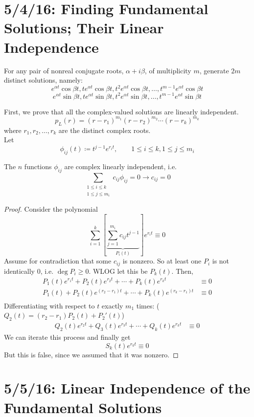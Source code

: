 \documentclass[12pt]{article}
\begin{document}
\section{5/4/16: Finding Fundamental Solutions; Their Linear Independence}
For any pair of nonreal conjugate roots, $\alpha + i\beta$, of multiplicity $m$, generate $2m$ distinct solutions, namely:
\[ e^{\alpha t}\cos{\beta t}, te^{\alpha t}\cos{\beta t}, t^2e^{\alpha t}\cos{\beta t}, \dots, t^{m-1}e^{\alpha t}\cos{\beta t} \]
\[ e^{\alpha t}\sin{\beta t}, te^{\alpha t}\sin{\beta t}, t^2e^{\alpha t}\sin{\beta t}, \dots, t^{m-1}e^{\alpha t}\sin{\beta t} \]

First, we prove that all the complex-valued solutions are linearly independent.
\[ p_L(r) = (r-r_1)^{m_1}(r-r_2)^{m_2}\cdots(r-r_k)^{m_k} \] where $r_1,r_2,\dots,r_k$ are the distinct complex roots. \\
Let \[ \phi_{ij}(t) \coloneqq t^{j-1}e^{r_it}, \qquad 1\le i \le k, 1 \le j \le m_i \]

\begin{theorem}
The $n$ functions $\phi_{ij}$ are complex linearly independent, i.e. \[ \sum_{\substack{1 \le i \le k \\ 1 \le j \le m_i}}c_{ij}\phi_{ij} = 0 \to c_{ij} = 0 \]
\end{theorem}

\begin{proof}
Consider the polynomial \[ \sum_{i=1}^k \left[\underbrace{\sum_{j=1}^{m_i}c_{ij}t^{j-1}}_{P_i(t)}\right]e^{r_it} \equiv 0 \]
Assume for contradiction that some $c_{ij}$ is nonzero. So at least one $P_i$ is not identically 0, i.e. $\deg{P_i} \ge 0$. WLOG let this be $P_k(t)$. Then,
\[
\begin{aligned}
  P_1(t)e^{r_1t} + P_2(t)e^{r_2t} + \cdots + P_k(t)e^{r_kt} &\equiv 0 \\
  P_1(t) + P_2(t)e^{(r_2 - r_1)t} + \cdots + P_k(t)e^{(r_k-r_1)t} &\equiv 0 \\
\end{aligned}
\]
Differentiating with respect to $t$ exactly $m_1$ times: ($Q_2(t) = (r_2 - r_1)P_2(t) + P_2'(t)$)
\[
\begin{aligned}
  Q_2(t)e^{r_2t} + Q_3(t)e^{r_3t} + \cdots + Q_k(t)e^{r_kt} &\equiv 0
\end{aligned}
\]
We can iterate this process and finally get \[ S_k(t)e^{r_kt} \equiv 0 \] But this is false, since we assumed that it was nonzero.
\end{proof}

\section{5/5/16: Linear Independence of the Fundamental Solutions}
\end{document}
